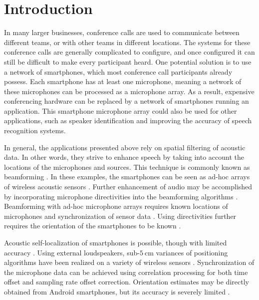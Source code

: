 \documentclass[a4paper, notitlepage]{report}
\begin{document}
\chapter{Introduction}
\label{ch:introduction}

In many larger businesses, conference calls are used to communicate between different teams, or with other teams in different locations. The systems for these conference calls are generally complicated to configure, and once configured it can still be difficult to make every participant heard.
One potential solution is to use a network of smartphones, which most conference call participants already possess. Each smartphone has at least one microphone, meaning a network of these microphones can be processed as a microphone array. As a result, expensive conferencing hardware can be replaced by a network of smartphones running an application.
This smartphone microphone array could also be used for other applications, such as speaker identification and improving the accuracy of speech recognition systems.

In general, the applications presented above rely on spatial filtering of acoustic data. In other words, they strive to enhance speech by taking into account the locations of the microphones and sources. This technique is commonly known as beamforming \cite{VanVeen19884}. In these examples, the smartphones can be seen as ad-hoc arrays of wireless acoustic sensors \cite{Gaubitch2014}. Further enhancement of audio may be accomplished by incorporating microphone directivities into the beamforming algorithms \cite{thomas2012, ba2007}. Beamforming with ad-hoc microphone arrays requires known locations of microphones \cite{himawan2011} and synchronization of sensor data \cite{Parviainen2014, golan2012}. Using directivities further requires the orientation of the smartphones to be known \cite{Gaubitch2014}.

Acoustic self-localization of smartphones is possible, though with limited accuracy \cite{Parviainen2014, hennecke2011}. Using external loudspeakers, sub-$5~\mathrm{cm}$ variances of positioning algorithms have been realized on a variety of wireless sensors \cite{raykar2005}.
Synchronization of the microphone data can be achieved using correlation processing for both time offset \cite{Knapp1976, wehr2004} and sampling rate offset \cite{golan2012, cherkassky2014} correction. 
Orientation estimates may be directly obtained from Android smartphones, but its accuracy is severely limited \cite{goslinski2015}.
\end{document}

